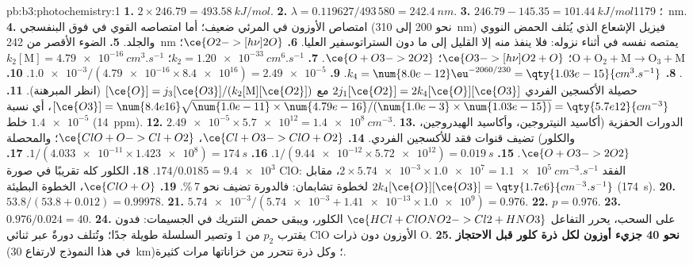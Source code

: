 \begin{solution}{pb:b3:photochemistry:1}
\textbf{1.} $2 \times 246.79 = \qty{493.58}{kJ/mol}$.
\textbf{2.} $\lambda = 0.119627/493\,580 = \qty{242.4}{nm}$.
\textbf{3.} $246.79 - 145.35 = \qty{101.44}{kJ/mol}$؛ \qty{1179}{nm}.
\textbf{4.} امتصاص الأوزون في المرئي ضعيف؛ أما امتصاصه القوي في فوق البنفسجي
(نحو 200 إلى \qty{310}{nm}) فيزيل الإشعاع الذي يُتلف الحمض النووي والجلد.
\textbf{5.} الضوء الأقصر من \qty{242}{nm} يمتصه  نفسه في أثناء نزوله: فلا ينفذ منه إلا القليل
إلى ما دون الستراتوسفير العليا.
\textbf{6.} $\ce{O2 ->[h\nu] 2 O}$؛ $\mathrm{O + O_2 + M \to O_3 + M}$؛ $\ce{O3 ->[h\nu] O2 + O}$؛ $\ce{O + O3 -> 2 O2}$.
\textbf{7.} $k_2 = \qty{1.20e-33}{cm^6.s^{-1}}$؛ $k_2[\mathrm M] = \qty{4.79e-16}{cm^3.s^{-1}}$.
\textbf{8.} $k_4 = \num{8.0e-12}\eu^{-2060/230} = \qty{1.03e-15}{cm^3.s^{-1}}$.
\textbf{9.} $\num{1.0e-3}/(\num{4.79e-16} \times \num{8.4e16}) = \num{2.49e-5}$.
\textbf{10.} حصيلة الأكسجين الفردي $2j_1[\ce{O2}] = 2k_4[\ce{O}][\ce{O3}]$ مع $[\ce{O}] = j_3[\ce{O3}]/(k_2[\mathrm M][\ce{O2}])$ (انظر
المبرهنة).
\textbf{11.} $[\ce{O3}] = \num{8.4e16}\sqrt{\num{1.0e-11} \times \num{4.79e-16}/(\num{1.0e-3} \times \num{1.03e-15})} =
\qty{5.7e12}{cm^{-3}}$، أي نسبة خلط $\num{1.4e-5}$ (\qty{14}{ppm}).
\textbf{12.} $\num{2.49e-5} \times \num{5.7e12} = \qty{1.4e8}{cm^{-3}}$.
\textbf{13.} الدورات الحفزية (أكاسيد النيتروجين، وأكاسيد الهيدروجين، والكلور) تضيف قنوات
فقد للأكسجين الفردي.
\textbf{14.} $\ce{Cl + O3 -> ClO + O2}$، $\ce{ClO + O -> Cl + O2}$؛ والمحصلة $\ce{O + O3 -> 2 O2}$.
\textbf{15.} $1/(\num{9.44e-12} \times \num{5.72e12}) = \qty{0.019}{s}$.
\textbf{16.} $1/(\num{4.033e-11} \times \num{1.423e8}) = \qty{174}{s}$.
\textbf{17.} $174/0.0185 = \num{9.4e3}$.
\textbf{18.} الكلور كله تقريبًا في صورة ClO: الفقد $2 \times \num{5.74e-3} \times \num{1.0e7} = \qty{1.1e5}{cm^{-3}.s^{-1}}$،
مقابل $2k_4[\ce{O}][\ce{O3}] = \qty{1.7e6}{cm^{-3}.s^{-1}}$ لخطوة تشابمان: فالدورة تضيف
نحو 7\,\%.
\textbf{19.} $\ce{ClO + O}$، الخطوة البطيئة (\qty{174}{s}).
\textbf{20.} $53.8/(53.8 + 0.012) = 0.99978$.
\textbf{21.} $\num{5.74e-3}/(\num{5.74e-3} + \num{1.41e-13} \times \num{1.0e9}) = 0.976$.
\textbf{22.} $p = 0.976$.
\textbf{23.} $0.976/0.024 = 40$.
\textbf{24.} على السحب، يحرر التفاعل $\ce{HCl + ClONO2 -> Cl2 + HNO3}$ الكلور، ويبقى حمض النتريك
في الجسيمات: فدون  يقترب $p_2$ من 1 وتصير السلسلة
طويلة جدًا؛ وتُتلف دورةٌ عبر ثنائي ClO الأوزون دون ذرات O.
\textbf{25.} \textbf{نحو 40 جزيء أوزون لكل ذرة كلور قبل الاحتجاز} (في هذا
النموذج لارتفاع \qty{30}{km})؛ وكل ذرة تتحرر من خزاناتها مرات كثيرة.
\end{solution}

